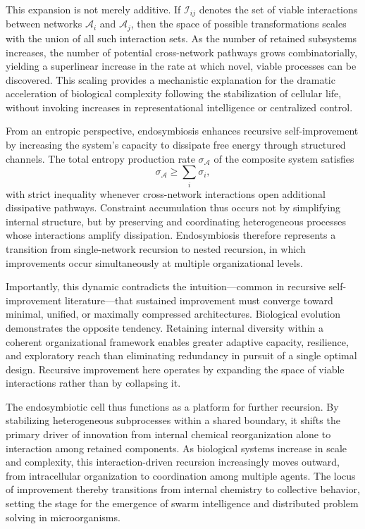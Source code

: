 \documentclass[11pt]{article}
\begin{document}
This expansion is not merely additive. If $\mathcal{I}_{ij}$ denotes the set of viable interactions between networks $\mathcal{A}_i$ and $\mathcal{A}_j$, then the space of possible transformations scales with the union of all such interaction sets. As the number of retained subsystems increases, the number of potential cross-network pathways grows combinatorially, yielding a superlinear increase in the rate at which novel, viable processes can be discovered. This scaling provides a mechanistic explanation for the dramatic acceleration of biological complexity following the stabilization of cellular life, without invoking increases in representational intelligence or centralized control.

From an entropic perspective, endosymbiosis enhances recursive self-improvement by increasing the system’s capacity to dissipate free energy through structured channels. The total entropy production rate $\sigma_{\mathcal{A}}$ of the composite system satisfies
\begin{equation}
\sigma_{\mathcal{A}} \geq \sum_i \sigma_i,
\end{equation}
with strict inequality whenever cross-network interactions open additional dissipative pathways. Constraint accumulation thus occurs not by simplifying internal structure, but by preserving and coordinating heterogeneous processes whose interactions amplify dissipation. Endosymbiosis therefore represents a transition from single-network recursion to nested recursion, in which improvements occur simultaneously at multiple organizational levels.

Importantly, this dynamic contradicts the intuition—common in recursive self-improvement literature—that sustained improvement must converge toward minimal, unified, or maximally compressed architectures. Biological evolution demonstrates the opposite tendency. Retaining internal diversity within a coherent organizational framework enables greater adaptive capacity, resilience, and exploratory reach than eliminating redundancy in pursuit of a single optimal design. Recursive improvement here operates by expanding the space of viable interactions rather than by collapsing it.

The endosymbiotic cell thus functions as a platform for further recursion. By stabilizing heterogeneous subprocesses within a shared boundary, it shifts the primary driver of innovation from internal chemical reorganization alone to interaction among retained components. As biological systems increase in scale and complexity, this interaction-driven recursion increasingly moves outward, from intracellular organization to coordination among multiple agents. The locus of improvement thereby transitions from internal chemistry to collective behavior, setting the stage for the emergence of swarm intelligence and distributed problem solving in microorganisms.
\end{document}
